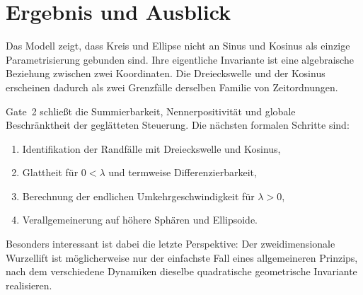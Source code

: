 \section{Ergebnis und Ausblick}

Das Modell zeigt, dass Kreis und Ellipse nicht an Sinus und Kosinus als
einzige Parametrisierung gebunden sind. Ihre eigentliche Invariante ist eine
algebraische Beziehung zwischen zwei Koordinaten. Die Dreieckswelle und der
Kosinus erscheinen dadurch als zwei Grenzfälle derselben Familie von
Zeitordnungen.

Gate~2 schließt die Summierbarkeit, Nennerpositivität und globale
Beschränktheit der geglätteten Steuerung. Die nächsten formalen Schritte sind:
\begin{enumerate}
  \item Identifikation der Randfälle mit Dreieckswelle und Kosinus,
  \item Glattheit für $0<\lambda$ und termweise Differenzierbarkeit,
  \item Berechnung der endlichen Umkehrgeschwindigkeit für $\lambda>0$,
  \item Verallgemeinerung auf höhere Sphären und Ellipsoide.
\end{enumerate}

Besonders interessant ist dabei die letzte Perspektive: Der zweidimensionale
Wurzellift ist möglicherweise nur der einfachste Fall eines allgemeineren
Prinzips, nach dem verschiedene Dynamiken dieselbe quadratische geometrische
Invariante realisieren.
